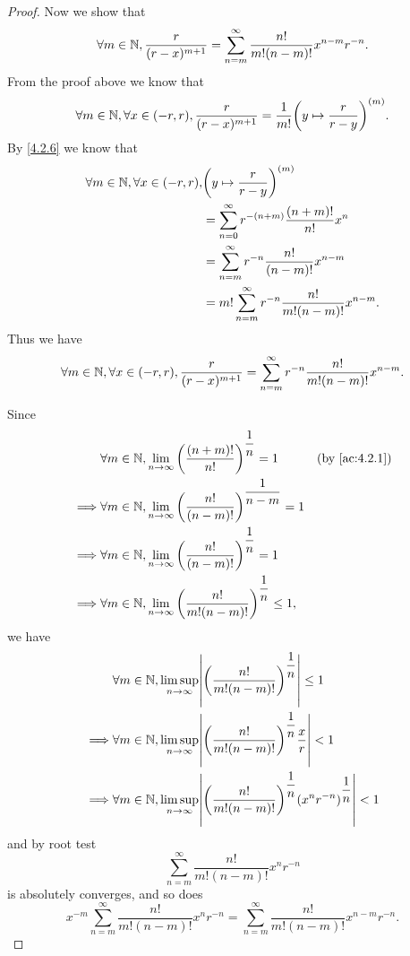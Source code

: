 \begin{proof}
  Now we show that
  \[
    \forall m \in \mathbb{N}, \dfrac{r}{(r - x)^{m + 1}} = \sum_{n = m}^\infty \dfrac{n!}{m! (n - m)!} x^{n - m} r^{-n}.
  \]
  From the proof above we know that
  \[
    \forall m \in \mathbb{N}, \forall x \in (-r, r), \dfrac{r}{(r - x)^{m + 1}} = \dfrac{1}{m!} \bigg(y \mapsto \dfrac{r}{r - y}\bigg)^{(m)}.
  \]
  By \cref{4.2.6} we know that
  \begin{align*}
    \forall m \in \mathbb{N}, \forall x \in (-r, r), & \bigg(y \mapsto \dfrac{r}{r - y}\bigg)^{(m)}                       \\
                                             & = \sum_{n = 0}^\infty r^{-(n + m)} \dfrac{(n + m)!}{n!} x^n        \\
                                             & = \sum_{n = m}^\infty r^{-n} \dfrac{n!}{(n - m)!} x^{n - m}        \\
                                             & = m! \sum_{n = m}^\infty r^{-n} \dfrac{n!}{m! (n - m)!} x^{n - m}.
  \end{align*}
  Thus we have
  \[
    \forall m \in \mathbb{N}, \forall x \in (-r, r), \dfrac{r}{(r - x)^{m + 1}} = \sum_{n = m}^\infty r^{-n} \dfrac{n!}{m! (n - m)!} x^{n - m}.
  \]

  Since
  \begin{align*}
             & \forall m \in \N, \lim_{n \to \infty} \bigg(\dfrac{(n + m)!}{n!}\bigg)^{\dfrac{1}{n}} = 1        &  & \by{ac:4.2.1} \\
    \implies & \forall m \in \N, \lim_{n \to \infty} \bigg(\dfrac{n!}{(n - m)!}\bigg)^{\dfrac{1}{n - m}} = 1                       \\
    \implies & \forall m \in \N, \lim_{n \to \infty} \bigg(\dfrac{n!}{(n - m)!}\bigg)^{\dfrac{1}{n}} = 1                           \\
    \implies & \forall m \in \N, \lim_{n \to \infty} \bigg(\dfrac{n!}{m! (n - m)!}\bigg)^{\dfrac{1}{n}} \leq 1,
  \end{align*}
  we have
  \begin{align*}
             & \forall m \in \N, \limsup_{n \to \infty} \abs{\bigg(\dfrac{n!}{m! (n - m)!}\bigg)^{\dfrac{1}{n}}} \leq 1                          \\
    \implies & \forall m \in \N, \limsup_{n \to \infty} \abs{\bigg(\dfrac{n!}{m! (n - m)!}\bigg)^{\dfrac{1}{n}} \dfrac{x}{r}} < 1                \\
    \implies & \forall m \in \N, \limsup_{n \to \infty} \abs{\bigg(\dfrac{n!}{m! (n - m)!}\bigg)^{\dfrac{1}{n}} (x^n r^{-n})^{\dfrac{1}{n}}} < 1
  \end{align*}
  and by root test
  \[
    \sum_{n = m}^\infty \dfrac{n!}{m! (n - m)!} x^n r^{-n}
  \]
  is absolutely converges, and so does
  \[
    x^{-m} \sum_{n = m}^\infty \dfrac{n!}{m! (n - m)!} x^n r^{-n} = \sum_{n = m}^\infty \dfrac{n!}{m! (n - m)!} x^{n - m} r^{-n}.
  \]
\end{proof}

